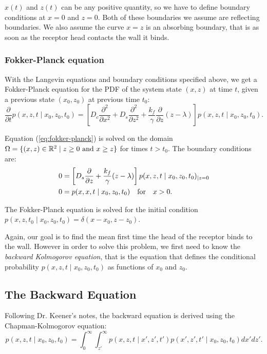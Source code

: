 \documentclass{article}
\newcommand{\tn}{\textnormal}
\newcommand{\stiff}{\frac{k_f}{\gamma}}
\newcommand{\dd}{d}
\newcommand{\Pder}[2]{\frac{\partial #1}{\partial #2}}
\newcommand{\Integral}[4]{\int_{#3}^{#4} {#1} \dd #2}
\newcommand{\xdiff}{\frac{\partial^2}{\partial x^2}}
\newcommand{\zdiff}{\frac{\partial^2}{\partial z^2}}
\def\R{\mathbb{R}}
\begin{document}
$x(t)$ and $z(t)$ can be any positive quantity, so we have to define
boundary conditions at $x = 0$ and $z = 0$. Both of these boundaries
we assume are reflecting boundaries. We also assume the curve $x = z$
is an absorbing boundary, that is as soon as the receptor head
contacts the wall it binds.

\subsubsection{Fokker-Planck equation}
\label{sec:fokk-planck-equat}

With the Langevin equations and boundary conditions specified above,
we get a Fokker-Planck equation for the PDF of the system state $(x,
z)$ at time $t$, given a previous state $(x_0, z_0)$ at previous time
$t_0$:
\begin{equation}
  \Pder{}{t}p(x, z, t \mid x_0, z_0, t_0) = \left[D_c \xdiff + D_s
    \zdiff + \stiff \Pder{}{z} (z - \lambda)\right] p(x, z, t \mid
  x_0, z_0, t_0).
  \label{eq:fokker-planck}
\end{equation}

Equation (\ref{eq:fokker-planck}) is solved on the domain $\Omega =
\{(x, z) \in \R^2  \mid  z \ge 0 \tn{ and } x \ge z\}$ for times $t >
t_0$. The boundary conditions are:
\begin{align}
  \label{eq:z-noflux}
  0 &= \left[D_s \Pder{}{z} + \stiff (z - \lambda)\right]p(x, z,
  t \mid x_0, z_0, t_0) _{|z = 0} \\
  \label{eq:xz-absorb}
  0 &= p(x, x, t \mid x_0, z_0, t_0) \quad \tn{for} \quad x > 0.
\end{align}

The Fokker-Planck equation is solved for the initial condition $p(x,
z, t_0 \mid x_0, z_0, t_0) = \delta(x - x_0, z - z_0)$.

Again, our goal is to find the mean first time the head of the
receptor binds to the wall. However in order to solve this problem, we
first need to know the \emph{backward Kolmogorov equation}, that is
the equation that defines the conditional probability $p(x, z, t \mid x_0,
z_0, t_0)$ as functions of $x_0$ and $z_0$.

\subsection{The Backward Equation}
\label{sec:backward-equation}

Following Dr. Keener's notes, the backward equation is derived using
the Chapman-Kolmogorov equation:
\begin{equation}
  p(x, z, t \mid x_0, z_0, t_0) = \Integral{\Integral{p(x, z, t \mid x', z', t')
      p(x', z', t' \mid x_0, z_0, t_0)}{x'}{z'}{\infty}}{z'}{0}{\infty}.
  \label{eq:chap-kolm}
\end{equation}
\end{document}
